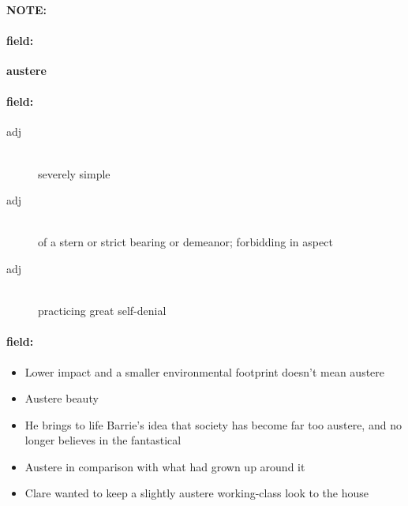 \documentclass[12pt]{article}
\newenvironment{note}{\paragraph{NOTE:}}{}
\newenvironment{field}{\paragraph{field:}}{}
\begin{document}
\begin{note}
\begin{field}
\textbf{\large austere}
\end{field}


\begin{field}
\begin{description}
\item[adj] \hfill \\ 
severely simple

\item[adj] \hfill \\ 
of a stern or strict bearing or demeanor; forbidding in aspect

\item[adj] \hfill \\ 
practicing great self-denial

\end{description}
\end{field}

\begin{field}
\begin{itemize}
\item Lower impact and a smaller environmental footprint doesn't mean austere
\item Austere beauty
\item He brings to life Barrie's idea that society has become far too austere, and no longer believes in the fantastical
\item Austere in comparison with what had grown up around it
\item Clare wanted to keep a slightly austere working-class look to the house
\end{itemize}
\end{field}
\end{note}
\end{document}
